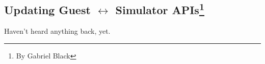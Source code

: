 \subsection[Updating Guest<->Simulator APIs]{Updating Guest $\leftrightarrow$ Simulator APIs\footnote{By Gabriel Black}}

Haven't heard anything back, yet.
